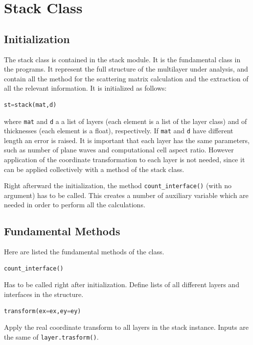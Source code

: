 \documentclass[a4paper,10pt]{report}
\begin{document}
\section{Stack Class}
\subsection{Initialization}

The stack class is contained in the stack module. It is the fundamental class in the programs. It represent the full structure of the multilayer under analysis, and contain all the method for the scattering matrix calculation and the extraction of all the relevant information. It is initialized as follows:
\begin{lstlisting}[language=Python,basicstyle=\ttfamily\Large]
st=stack(mat,d)
\end{lstlisting}
where \texttt{mat} and \texttt{d} a a list of layers (each element is a list of the layer class) and of thicknesses (each element is a float), respectively. If \texttt{mat} and \texttt{d} have different length an error is raised. It is important that each layer has the same parameters, such as number of plane waves and computational cell aspect ratio. However application of the coordinate transformation to each layer is not needed, since it can be applied collectively with a method of the stack class. 

Right afterward the initialization, the method \texttt{count\_interface()} (with no argument) has to be called. This creates a number of auxiliary variable which are needed in order to perform all the calculations. 

\subsection{Fundamental Methods}
Here are listed the fundamental methods of the class.

\begin{lstlisting}[language=Python,basicstyle=\ttfamily\Large]
count_interface()
\end{lstlisting}
Has to be called right after initialization. Define lists of all different layers and interfaces in the structure. 

\begin{lstlisting}[language=Python,basicstyle=\ttfamily\Large]
transform(ex=ex,ey=ey)
\end{lstlisting}
Apply the real coordinate transform to all layers in the stack instance. Inputs are the same of \texttt{layer.trasform()}.
\end{document}
